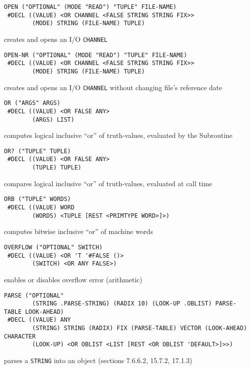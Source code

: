 \documentclass[a4paper]{scrbook}
\begin{document}
\begin{verbatim}
OPEN ("OPTIONAL" (MODE "READ") "TUPLE" FILE-NAME)
 #DECL ((VALUE) <OR CHANNEL <FALSE STRING STRING FIX>>
        (MODE) STRING (FILE-NAME) TUPLE)
\end{verbatim}

creates and opens an I/O \texttt{CHANNEL}

\begin{verbatim}
OPEN-NR ("OPTIONAL" (MODE "READ") "TUPLE" FILE-NAME)
 #DECL ((VALUE) <OR CHANNEL <FALSE STRING STRING FIX>>
        (MODE) STRING (FILE-NAME) TUPLE)
\end{verbatim}

creates and opens an I/O \texttt{CHANNEL} without changing file's reference date

\begin{verbatim}
OR ("ARGS" ARGS)
 #DECL ((VALUE) <OR FALSE ANY>
        (ARGS) LIST)
\end{verbatim}

computes logical inclusive ``or'' of truth-values, evaluated by the Subroutine

\begin{verbatim}
OR? ("TUPLE" TUPLE)
 #DECL ((VALUE) <OR FALSE ANY>
        (TUPLE) TUPLE)
\end{verbatim}

compares logical inclusive ``or'' of truth-values, evaluated at call time

\begin{verbatim}
ORB ("TUPLE" WORDS)
 #DECL ((VALUE) WORD
        (WORDS) <TUPLE [REST <PRIMTYPE WORD>]>)
\end{verbatim}

computes bitwise inclusive ``or'' of machine words

\begin{verbatim}
OVERFLOW ("OPTIONAL" SWITCH)
 #DECL ((VALUE) <OR 'T '#FALSE ()>
        (SWITCH) <OR ANY FALSE>)
\end{verbatim}

enables or disables overflow error (arithmetic)

\begin{verbatim}
PARSE ("OPTIONAL"
        (STRING .PARSE-STRING) (RADIX 10) (LOOK-UP .OBLIST) PARSE-TABLE LOOK-AHEAD)
 #DECL ((VALUE) ANY
        (STRING) STRING (RADIX) FIX (PARSE-TABLE) VECTOR (LOOK-AHEAD) CHARACTER
        (LOOK-UP) <OR OBLIST <LIST [REST <OR OBLIST 'DEFAULT>]>>)
\end{verbatim}

parses a \texttt{STRING} into an object (sections 7.6.6.2, 15.7.2, 17.1.3)
\end{document}
